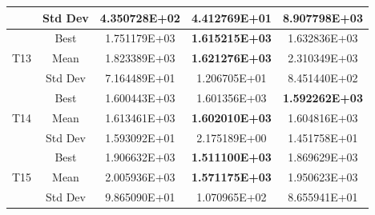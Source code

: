 \documentclass[letterpaper]{article}
\begin{document}
\begin{center}
\begin{table}[htbp]
\begin{center}
{\begin{tabular}{|c|c|c|c|c|}
				\multicolumn{ 1}{|c|}{} & Std Dev & 4.350728E+02 & 4.412769E+01 & 8.907798E+03 \\ \hline
				\multicolumn{ 1}{|c|}{} & Best & 1.751179E+03 & \textbf{1.615215E+03} & 1.632836E+03 \\ \cline{ 2- 5}
				\multicolumn{ 1}{|c|}{T13} & Mean & 1.823389E+03 & \textbf{1.621276E+03} & 2.310349E+03 \\ \cline{ 2- 5}
				\multicolumn{ 1}{|c|}{} & Std Dev & 7.164489E+01 & 1.206705E+01 & 8.451440E+02 \\ \hline
				\multicolumn{ 1}{|c|}{} & Best & 1.600443E+03 & 1.601356E+03 & \textbf{1.592262E+03} \\ \cline{ 2- 5}
				\multicolumn{ 1}{|c|}{T14} & Mean & 1.613461E+03 & \textbf{1.602010E+03} & 1.604816E+03 \\ \cline{ 2- 5}
				\multicolumn{ 1}{|c|}{} & Std Dev & 1.593092E+01 & 2.175189E+00 & 1.451758E+01 \\ \hline
				\multicolumn{ 1}{|c|}{} & Best & 1.906632E+03 & \textbf{1.511100E+03} & 1.869629E+03 \\ \cline{ 2- 5}
				\multicolumn{ 1}{|c|}{T15} & Mean & 2.005936E+03 & \textbf{1.571175E+03} & 1.950623E+03 \\ \cline{ 2- 5}
				\multicolumn{ 1}{|c|}{} & Std Dev & 9.865090E+01 & 1.070965E+02 & 8.655941E+01 \\ \hline
			\end{tabular}}
	\end{center}
	\label{results}
\end{table}
\end{center}
\end{document}
